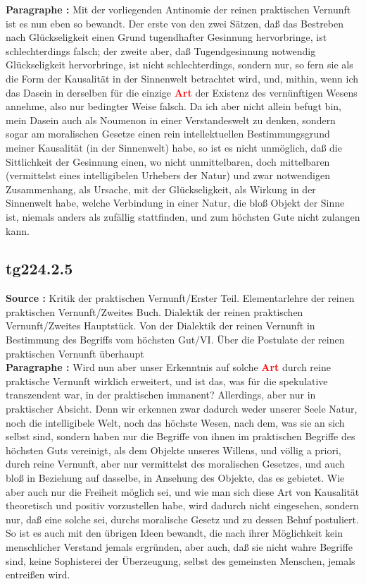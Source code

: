 \documentclass[a4paper,12pt,twoside]{book}
\newcommand{\match}[1]{\textcolor{red}{\textbf{#1}}}
\begin{document}
	\noindent\textbf{Paragraphe : }Mit der vorliegenden Antinomie der reinen praktischen Vernunft ist es nun eben so bewandt. Der erste von den zwei Sätzen, daß das Bestreben nach Glückseligkeit einen Grund tugendhafter Gesinnung hervorbringe, ist schlechterdings falsch; der zweite aber, daß Tugendgesinnung notwendig Glückseligkeit hervorbringe, ist nicht schlechterdings, sondern nur, so fern sie als die Form der Kausalität in der Sinnenwelt betrachtet wird, und, mithin, wenn ich das Dasein in derselben für die einzige \match{Art} der Existenz des vernünftigen Wesens annehme, also nur bedingter Weise falsch. Da ich aber nicht allein befugt bin, mein Dasein auch als Noumenon in einer Verstandeswelt zu denken, sondern sogar am moralischen Gesetze einen rein intellektuellen Bestimmungsgrund meiner Kausalität (in der Sinnenwelt) habe, so ist es nicht unmöglich, daß die Sittlichkeit der Gesinnung einen, wo nicht unmittelbaren, doch mittelbaren (vermittelst eines intelligibelen Urhebers  der Natur) und zwar notwendigen Zusammenhang, als Ursache, mit der Glückseligkeit, als Wirkung in der Sinnenwelt habe, welche Verbindung in einer Natur, die bloß Objekt der Sinne ist, niemals anders als zufällig stattfinden, und zum höchsten Gute nicht zulangen kann. 
	
	\subsection*{tg224.2.5} 
	\textbf{Source : }Kritik der praktischen Vernunft/Erster Teil. Elementarlehre der reinen praktischen Vernunft/Zweites Buch. Dialektik der reinen praktischen Vernunft/Zweites Hauptstück. Von der Dialektik der reinen Vernunft in Bestimmung des Begriffs vom höchsten Gut/VI. Über die Postulate der reinen praktischen Vernunft überhaupt\\  
	
	\noindent\textbf{Paragraphe : }Wird nun aber unser Erkenntnis auf solche \match{Art} durch reine praktische Vernunft wirklich erweitert, und ist das, was für die spekulative transzendent war, in der praktischen immanent? Allerdings, aber nur in praktischer Absicht. Denn wir erkennen zwar dadurch weder unserer  Seele Natur, noch die intelligibele Welt, noch das höchste Wesen, nach dem, was sie an sich selbst sind, sondern haben nur die Begriffe von ihnen im praktischen Begriffe des höchsten Guts vereinigt, als dem Objekte unseres Willens, und völlig a priori, durch reine Vernunft, aber nur vermittelst des moralischen Gesetzes, und auch bloß in Beziehung auf dasselbe, in Ansehung des Objekte, das es gebietet. Wie aber auch nur die Freiheit möglich sei, und wie man sich diese Art von Kausalität theoretisch und positiv vorzustellen habe, wird dadurch nicht eingesehen, sondern nur, daß eine solche sei, durchs moralische Gesetz und zu dessen Behuf postuliert. So ist es auch mit den übrigen Ideen bewandt, die nach ihrer Möglichkeit kein menschlicher Verstand jemals ergründen, aber auch, daß sie nicht wahre Begriffe sind, keine Sophisterei der Überzeugung, selbst des gemeinsten Menschen, jemals entreißen wird. 
	
\end{document}
